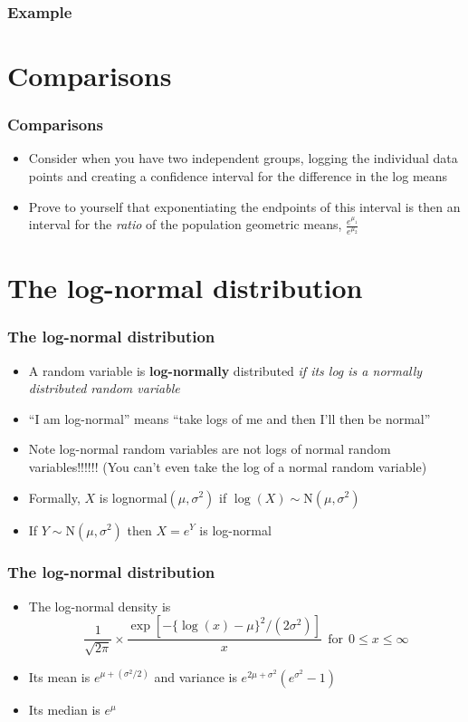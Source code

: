 \documentclass[aspectratio=169]{beamer}
\begin{document}
\begin{frame}\frametitle{Example}
\end{frame}

\section{Comparisons}
\begin{frame}\frametitle{Comparisons}
\begin{itemize}
\item Consider when you have two independent groups, logging the
  individual data points and creating a confidence interval for the
  difference in the log means
\item Prove to yourself that exponentiating the endpoints of this
  interval is then an interval for the {\em ratio} of the population
  geometric means, $\frac{e^{\mu_1}}{e^{\mu_2}}$
\end{itemize}
\end{frame}

\section{The log-normal distribution}
\begin{frame}\frametitle{The log-normal distribution}
\begin{itemize}
\item A random variable is {\bf log-normally} distributed {\em if its log
    is a normally distributed random variable}
\item ``I am log-normal'' means ``take logs of me and then I'll then be normal''
\item Note log-normal random variables are not logs of normal random variables!!!!!! (You can't even take the log of a normal random variable)
\item Formally, $X$ is lognormal$(\mu,\sigma^2)$ if $\log(X) \sim \mbox{N}(\mu, \sigma^2)$
\item If $Y \sim \mbox{N}(\mu,\sigma^2)$ then $X = e^Y$ is log-normal
\end{itemize}
\end{frame} 

\begin{frame}\frametitle{The log-normal distribution}
\begin{itemize}
\item The log-normal density is
$$
\frac{1}{\sqrt{2\pi}} \times \frac{\exp[-\{\log(x) - \mu\}^2/ (2\sigma^2)]}{x}
~~\mbox{for}~~ 0\leq x \leq \infty
$$
\item Its mean is $e^{\mu + (\sigma^2 / 2)}$ and variance is $e^{2\mu + \sigma^2}(e^{ \sigma^2} - 1)$
\item Its median is $e^\mu$
\end{itemize}
\end{frame}
\end{document}
